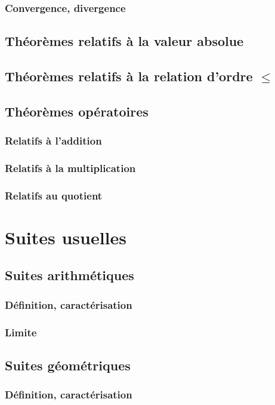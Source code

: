 \documentclass[12pt,a4paper,french]{book}
\begin{document}
			\subsubsection{Convergence, divergence}
		\subsection{Théorèmes relatifs à la valeur absolue}
		\subsection{Théorèmes relatifs à la relation d'ordre $\leqslant$}
		\subsection{Théorèmes opératoires}
			\subsubsection{Relatifs à l'addition}
			\subsubsection{Relatifs à la multiplication}
			\subsubsection{Relatifs au quotient}
	\section{Suites usuelles}
		\subsection{Suites arithmétiques}
			\subsubsection{Définition, caractérisation}
			\subsubsection{Limite}
		\subsection{Suites géométriques}
			\subsubsection{Définition, caractérisation}
\end{document}

